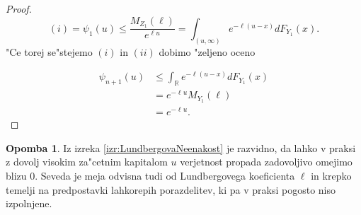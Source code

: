 \documentclass[12pt, a4paper, reqno]{amsart}
\theoremstyle{definition}
\newtheorem{opomba}[definicija]{Opomba}
\theoremstyle{plain}
\newcommand{\R}{\mathbb{R}}
\newcommand{\1}{\mathds{1}}
\begin{document}
\begin{proof}
                \begin{equation*}
                    (i) = \psi_1(u) \leq \frac{M_{Z_1}(\ell)}{e^{\ell u}} = \int_{(u, \infty)}e^{-\ell (u-x)}dF_{Y_1}(x).
                \end{equation*}
                "Ce torej se"stejemo $(i)$ in $(ii)$ dobimo "zeljeno oceno

                \begin{align*}
                    \psi_{n+1}(u) &\leq \int_{\R}e^{-\ell (u - x)}dF_{Y_1}(x) \\
                                  &= e^{-\ell u}M_{Y_1}(\ell) \\
                                  &= e^{-\ell u}.
                \end{align*}

            \end{proof}

            \begin{opomba}
                Iz izreka \ref{izr:LundbergovaNeenakost} je razvidno, da lahko v praksi z
                 dovolj visokim za"cetnim kapitalom
                $u$ verjetnost propada zadovoljivo omejimo blizu $0$. Seveda je meja 
                odvisna tudi od Lundbergovega koeficienta $\ell$ in krepko temelji na predpostavki 
                lahkorepih porazdelitev, ki pa v praksi pogosto niso izpolnjene.
                \label{op:LundbergovaNeenakost}
            \end{opomba}
\end{document}
